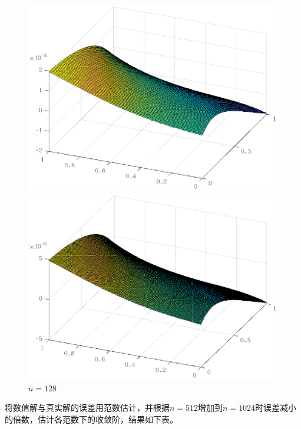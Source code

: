\documentclass[lang=cn,10pt]{elegantbook}
\begin{document}
\begin{figure}[H]
\begin{minipage}[t]{0.24\linewidth}
    \includegraphics[width=0.95\linewidth]{figure/3-2-3.eps}
    \caption*{$n=64$}
  \end{minipage}
  \begin{minipage}[t]{0.24\linewidth}
    \centering
    \includegraphics[width=0.95\linewidth]{figure/3-2-4.eps}
    \caption*{$n=128$}
  \end{minipage}
\end{figure}

将数值解与真实解的误差用范数估计，并根据$n=512$增加到$n=1024$时误差减小的倍数，估计各范数下的收敛阶，结果如下表。
\end{document}
